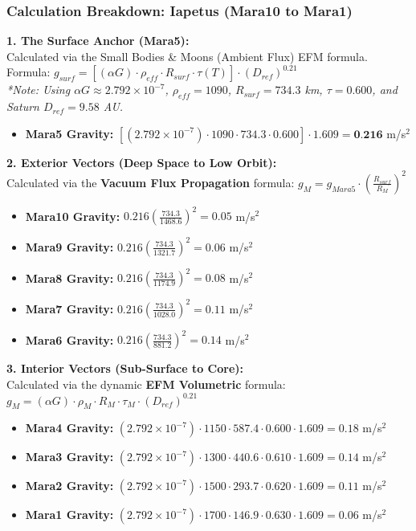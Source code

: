 \documentclass[11pt, a4paper]{article}
\begin{document}
\clearpage
\subsubsection{Calculation Breakdown: Iapetus (Mara10 to Mara1)}

\noindent \textbf{1. The Surface Anchor (Mara5):} \\
Calculated via the Small Bodies \& Moons (Ambient Flux) EFM formula. \\
Formula: $g_{surf} = \left[ (\alpha G) \cdot \rho_{eff} \cdot R_{surf} \cdot \tau(T) \right] \cdot (D_{ref})^{0.21}$ \\
\textit{*Note: Using $\alpha G \approx 2.792 \times 10^{-7}$, $\rho_{eff} = 1090$, $R_{surf} = 734.3$ km, $\tau = 0.600$, and Saturn $D_{ref} = 9.58$ AU.}
\begin{itemize}
  \item \textbf{Mara5 Gravity:} $\left[ (2.792 \times 10^{-7}) \cdot 1090 \cdot 734.3 \cdot 0.600 \right] \cdot 1.609 = \textbf{0.216}$ m/s$^2$
\end{itemize}

\vspace{0.5em}
\noindent \textbf{2. Exterior Vectors (Deep Space to Low Orbit):} \\
Calculated via the \textbf{Vacuum Flux Propagation} formula: $g_M = g_{Mara5} \cdot \left( \frac{R_{surf}}{R_M} \right)^2$
\begin{itemize}
  \item \textbf{Mara10 Gravity:} $0.216 \left( \frac{734.3}{1468.6} \right)^2 = 0.05$ m/s$^2$
  \item \textbf{Mara9 Gravity:} $0.216 \left( \frac{734.3}{1321.7} \right)^2 = 0.06$ m/s$^2$
  \item \textbf{Mara8 Gravity:} $0.216 \left( \frac{734.3}{1174.9} \right)^2 = 0.08$ m/s$^2$
  \item \textbf{Mara7 Gravity:} $0.216 \left( \frac{734.3}{1028.0} \right)^2 = 0.11$ m/s$^2$
  \item \textbf{Mara6 Gravity:} $0.216 \left( \frac{734.3}{881.2} \right)^2 = 0.14$ m/s$^2$
\end{itemize}

\vspace{0.5em}
\noindent \textbf{3. Interior Vectors (Sub-Surface to Core):} \\
Calculated via the dynamic \textbf{EFM Volumetric} formula: $g_M = (\alpha G) \cdot \rho_{M} \cdot R_M \cdot \tau_M \cdot (D_{ref})^{0.21}$
\begin{itemize}
  \item \textbf{Mara4 Gravity:} $(2.792 \times 10^{-7}) \cdot 1150 \cdot 587.4 \cdot 0.600 \cdot 1.609 = 0.18$ m/s$^2$
  \item \textbf{Mara3 Gravity:} $(2.792 \times 10^{-7}) \cdot 1300 \cdot 440.6 \cdot 0.610 \cdot 1.609 = 0.14$ m/s$^2$
  \item \textbf{Mara2 Gravity:} $(2.792 \times 10^{-7}) \cdot 1500 \cdot 293.7 \cdot 0.620 \cdot 1.609 = 0.11$ m/s$^2$
  \item \textbf{Mara1 Gravity:} $(2.792 \times 10^{-7}) \cdot 1700 \cdot 146.9 \cdot 0.630 \cdot 1.609 = 0.06$ m/s$^2$
\end{itemize}
\end{document}

